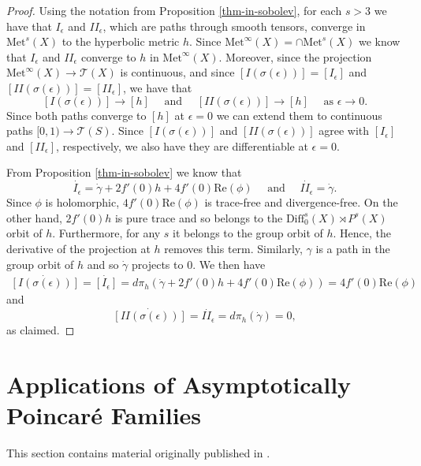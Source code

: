 \documentclass{amsart}
\newcommand{\two}{I\!\!I}
\begin{document}
\begin{proof}
Using the notation from  Proposition \ref{thm-in-sobolev}, for each $s > 3$ we have that $I_\epsilon$ and $\two_\epsilon$, which are paths through smooth tensors, converge in $\mathrm{Met}^s(X)$ to the hyperbolic metric $h$. 
Since $\mathrm{Met}^\infty(X)  = \cap \mathrm{Met}^s(X)$ we know that $I_\epsilon$ and $\two_\epsilon$ converge to $h$ in $\mathrm{Met}^\infty(X)$. 
Moreover, since the projection $\mathrm{Met}^\infty(X) \to \mathcal{T}(X)$ is continuous, and since $[I(\sigma(\epsilon))] = [I_\epsilon]$ and $[\two(\sigma(\epsilon))] = [\two_\epsilon]$, we have that
\[
[I(\sigma(\epsilon))] \to [h]
\quad \text{ and } \quad 
[\two(\sigma(\epsilon))] \to [h]
\quad \text{ as } \epsilon \to 0.
\]
Since both paths converge to $[h]$ at $\epsilon = 0$ we can extend them to continuous paths $[0,1) \to \mathcal{T}(S)$. 
Since $[I(\sigma(\epsilon))]$ and  $[\two(\sigma(\epsilon))]$ agree with $[I_\epsilon]$ and $[\two_\epsilon]$, respectively, we also have they are differentiable at $\epsilon = 0$.

From Proposition \ref{thm-in-sobolev} we know that 
\[
\dot{I_\epsilon}  = \dot{\gamma} + 2 f'(0) h + 4 f'(0) \mathrm{Re}(\phi) \quad \text{ and } \quad \dot{\two_\epsilon} = \dot{\gamma}.
\]
Since $\phi$ is holomorphic, $4 f'(0) \mathrm{Re}(\phi)$ is trace-free and divergence-free. 
On the other hand, $2 f'(0) h$ is pure trace and so belongs to the $\mathrm{Diff}_0^s(X) \rtimes P^s(X)$ orbit of $h$. Furthermore, for any $s$ it belongs to the group orbit of $h$. 
Hence, the derivative of the projection at $h$ removes this term.
Similarly, $\gamma$ is a path in the group orbit of $h$ and so $\dot{\gamma}$ projects to 0. 
We then have
\begin{align*}
\dot{[I(\sigma(\epsilon))]}
= \dot{[I_\epsilon]}
= d \pi_h (\dot{\gamma} + 2 f'(0) h + 4 f'(0) \mathrm{Re}(\phi)) 
= 4 f'(0) \mathrm{Re}(\phi)
\end{align*}
and
\[
\dot{[\two(\sigma(\epsilon))]} = \dot{\two_\epsilon} = d \pi_h (\dot{\gamma}) = 0,
\]
as claimed.
\end{proof}


\section{Applications of Asymptotically Poincar\'e Families} \label{applications}

\begin{center}This section contains material originally published in \cite{quinn2020}.
\end{center}
\end{document}
